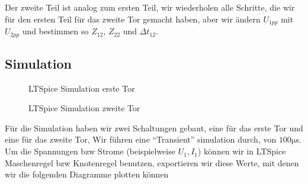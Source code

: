 \par Der zweite Teil ist analog zum ersten Teil, wir wiederholen alle Schritte, die wir für den ersten Teil für das zweite Tor gemacht haben, aber wir ändern $U_{1pp}$ mit $U_{2pp}$ und bestimmen so $Z_{12}$, $Z_{22}$ und $\Delta t_{12}$.
%
%
%
\begin{flushright}
  \textit{\autorA}
\end{flushright}
%
%
%
%
\subsection{Simulation}
\label{subsec:3_Simulation}
%
%
\begin{figure}[H]
    \centering
    
    \caption{LTSpice Simulation erste Tor}
    \label{fig:LTSpice1}
\end{figure}
\newpage
\begin{figure}[H]
    \centering
    
    \caption{LTSpice Simulation zweite Tor}
    \label{fig:LTspice2}
\end{figure}
\newpage
Für die Simulation haben wir zwei Schaltungen gebaut, eine für das erste Tor und eine für das zweite Tor, Wir führen eine \enquote{Transient} simulation durch, von $100\si{\micro\second}$. Um die Spannungen bzw Strome (beispielweise $U_1,I_1$) können wir in LTSpice Maschenregel bzw Knotenregel benutzen, exportieren wir diese Werte, mit denen wir die folgenden Diagramme plotten können
